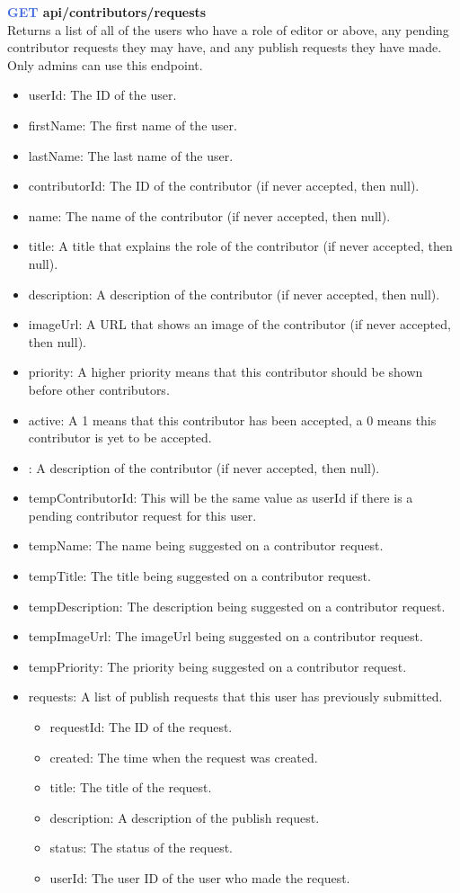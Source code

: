\documentclass[onecolumn, draftclsnofoot,10pt, compsoc, usenames, dvipsnames]{IEEEtran}
\begin{document}
\noindent
\textbf{\textcolor{RoyalBlue}{GET} api/contributors/requests} \\
Returns a list of all of the users who have a role of editor or above, any pending contributor requests they may have, and any publish requests they have made. Only admins can use this endpoint.
\begin{itemize}
    \item userId: The ID of the user.
    \item firstName: The first name of the user.
    \item lastName: The last name of the user.
    \item contributorId: The ID of the contributor (if never accepted, then null).
    \item name: The name of the contributor (if never accepted, then null).
    \item title: A title that explains the role of the contributor (if never accepted, then null).
    \item description: A description of the contributor (if never accepted, then null).
    \item imageUrl: A URL that shows an image of the contributor (if never accepted, then null).
    \item priority: A higher priority means that this contributor should be shown before other contributors.
    \item active: A 1 means that this contributor has been accepted, a 0 means this contributor is yet to be accepted.
    \item : A description of the contributor (if never accepted, then null).
    \item tempContributorId: This will be the same value as userId if there is a pending contributor request for this user.
    \item tempName: The name being suggested on a contributor request.
    \item tempTitle: The title being suggested on a contributor request.
    \item tempDescription: The description being suggested on a contributor request.
    \item tempImageUrl: The imageUrl being suggested on a contributor request.
    \item tempPriority: The priority being suggested on a contributor request.
    \item requests: A list of publish requests that this user has previously submitted.
    \begin{itemize}
        \item requestId: The ID of the request.
        \item created: The time when the request was created.
        \item title: The title of the request.
        \item description: A description of the publish request.
        \item status: The status of the request.
        \item userId: The user ID of the user who made the request.
    \end{itemize}
\end{itemize}
\end{document}
